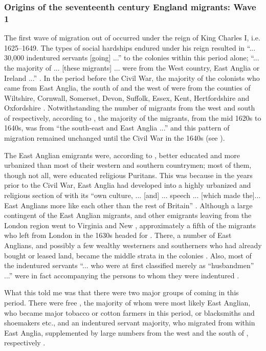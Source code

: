 \subsubsection{Origins of the seventeenth century England migrants: Wave 1}\label{6.2.1.1}
The first wave of migration out of  occurred under the reign of King Charles I, i.e. 1625--1649. The types of social hardships endured under his reign resulted in ``... 30,000 indentured servants [going] ...'' to the  colonies within this period alone; ``... the majority of ... [these migrants] ... were from the West country, East Anglia or Ireland ...'' \citep[25--26]{Parker11}. In the period before the Civil War, the majority of the colonists who came from East Anglia, the south of  and the west of  were from the counties of Wiltshire, Cornwall, Somerset, Devon, Suffolk, Essex, Kent, Hertfordshire and Oxfordshire \citep{Watts90, Kennedy09}. Notwithstanding the number of migrants from the west and south of  respectively, according to \citet[137]{Currer82}, the majority of the migrants, from the mid 1620s to 1640s, was from ``the south-east and East Anglia ...'' and this pattern of migration remained unchanged until the  Civil War in the 1640s (see ).

The East Anglian emigrants were, according to \citet{Collins99}, better educated and more urbanized than most of their western and southern countrymen; most of them, though not all, were educated religious Puritans. This was because in the years prior to the Civil War, East Anglia had developed into a highly urbanized and religious section of  with its ``own culture, ... [and] ... speech ... [which made the]... East Anglians more like each other than the rest of Britain'' \citep[18]{Collins99}. Although a large contingent of the East Anglian migrants, and other emigrants leaving from the London region went to Virginia and New , approximately a fifth of the migrants who left from London in the 1630s headed for  \citep{Parker11}. There, a number of East Anglians, and possibly a few wealthy westerners and southerners who had already bought or leased land, became the middle strata in the  colonies \citet{Collins99}. Also, most of the indentured servants ``... who were at first classified merely as ``husbandmen'' ...'' were in fact accompanying the persons to whom they were indentured \citep[150]{Watts90}.

What this told me was that there were two major groups of  coming in this period. There were free , the majority of whom were most likely East Anglian, who became major tobacco or cotton farmers in this period, or blacksmiths and shoemakers etc., and an indentured servant majority, who migrated from within East Anglia, supplemented by large numbers from the west and the south of , respectively \citep{Watts90, Parker11}.

